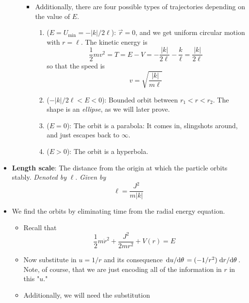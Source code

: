 \documentclass[../notes.tex]{subfiles}
\begin{document}
\begin{itemize}
\begin{itemize}
\begin{itemize}
            \item Additionally, there are four possible types of trajectories depending on the value of $E$.
            \begin{enumerate}
                \item ($E=U_\text{min}=-|k|/2\ell$): $\vec{r}=0$, and we get uniform circular motion with $r=\ell$. The kinetic energy is
                \begin{equation*}
                    \frac{1}{2}mv^2 = T
                    = E-V
                    = -\frac{|k|}{2\ell}-\frac{k}{\ell}
                    = \frac{|k|}{2\ell}
                \end{equation*}
                so that the speed is
                \begin{equation*}
                    v = \sqrt{\frac{|k|}{m\ell}}
                \end{equation*}
                \item ($-|k|/2\ell<E<0$): Bounded orbit between $r_1<r<r_2$. The shape is an \emph{ellipse}, as we will later prove.
                \item ($E=0$): The orbit is a parabola: It comes in, slingshots around, and just escapes back to $\infty$.
                \item ($E>0$): The orbit is a hyperbola.
            \end{enumerate}
        \end{itemize}
    \end{itemize}
    \item \textbf{Length scale}: The distance from the origin at which the particle orbits stably. \emph{Denoted by} $\bm{\ell}$. \emph{Given by}
    \begin{equation*}
        \ell = \frac{J^2}{m|k|}
    \end{equation*}
    \item We find the orbits by eliminating time from the radial energy equation.
    \begin{itemize}
        \item Recall that
        \begin{equation*}
            \frac{1}{2}m\dot{r}^2+\frac{J^2}{2mr^2}+V(r) = E
        \end{equation*}
        \item Now substitute in $u=1/r$ and its consequence $\dv*{u}{\theta}=(-1/r^2)\dv*{r}{\theta}$. Note, of course, that we are just encoding all of the information in $r$ in this "$u$."
        \item Additionally, we will need the substitution

\end{itemize}
\end{itemize}
\end{document}
